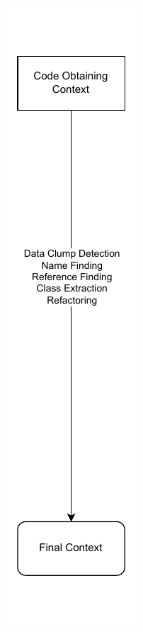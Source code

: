 \begin{figure}[H]
\begin{adjustbox}{minipage=\linewidth,scale=0.7}
\begin{subfigure}[b]{0.3\textwidth}
         \includegraphics[width=\textwidth]{figures/chapter3/context_pipeline_1.drawio.pdf}

\end{subfigure}
\end{adjustbox}
\end{figure}
